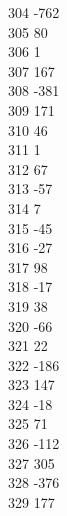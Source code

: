 { 304	-762 \\
 305	80 \\
 306	1 \\
 307	167 \\
 308	-381 \\
 309	171 \\
 310	46 \\
 311	1 \\
 312	67 \\
 313	-57 \\
 314	7 \\
 315	-45 \\
 316	-27 \\
 317	98 \\
 318	-17 \\
 319	38 \\
 320	-66 \\
 321	22 \\
 322	-186 \\
 323	147 \\
 324	-18 \\
 325	71 \\
 326	-112 \\
 327	305 \\
 328	-376 \\
 329	177 \\
}
